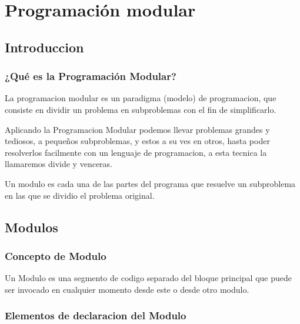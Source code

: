 
\chapter{Programación modular}
\renewcommand{\chaptername}{Lecture}
\section{Introduccion}

\subsection{¿Qué es la Programación Modular?}


La programacion modular es un paradigma (modelo) de programacion, que consiste en dividir un problema en subproblemas con el fin de simplificarlo.

Aplicando la Programacion Modular podemos llevar problemas grandes y tediosos, a pequeños subproblemas, y estos a su ves en otros, hasta poder resolverlos facilmente con un lenguaje de programacion, a esta tecnica la llamaremos divide y venceras.

Un modulo es cada una de las partes del programa que resuelve un subproblema en las que se dividio el problema original.

\section{Modulos}

\subsection{Concepto de Modulo}

Un Modulo es una segmento de codigo separado del bloque principal que puede ser invocado en cualquier momento desde este o desde otro modulo.

\subsection{Elementos de declaracion del Modulo}

